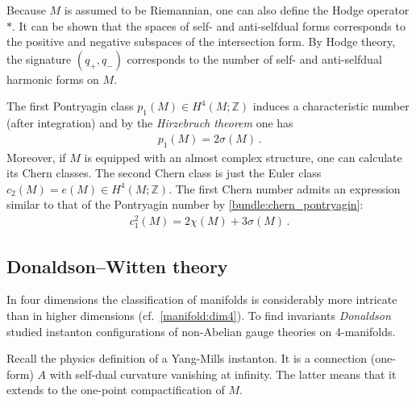     Because $M$ is assumed to be Riemannian, one can also define the Hodge operator $\ast$. It can be shown that the spaces of self- and anti-selfdual forms corresponds to the positive and negative subspaces of the intersection form. By Hodge theory, the signature $(q_+,q_-)$ corresponds to the number of self- and anti-selfdual harmonic forms on $M$.

    The first Pontryagin class $p_1(M)\in H^4(M;\mathbb{Z})$ induces a characteristic number (after integration) and by the \textit{Hirzebruch theorem} one has
    \begin{gather}
        p_1(M) = 2\sigma(M)\,.
    \end{gather}
    Moreover, if $M$ is equipped with an almost complex structure, one can calculate its Chern classes. The second Chern class is just the Euler class $c_2(M)=e(M)\in H^4(M;\mathbb{Z})$. The first Chern number admits an expression similar to that of the Pontryagin number by \cref{bundle:chern_pontryagin}:
    \begin{gather}
        c^2_1(M) = 2\chi(M) + 3\sigma(M)\,.
    \end{gather}

\subsection{Donaldson--Witten theory}

    In four dimensions the classification of manifolds is considerably more intricate than in higher dimensions (cf.~\cref{manifold:dim4}). To find invariants \textit{Donaldson} studied instanton configurations of non-Abelian gauge theories on 4-manifolds.

    Recall the physics definition of a Yang-Mills instanton. It is a connection (one-form) $A$ with self-dual curvature vanishing at infinity. The latter means that it extends to the one-point compactification of $M$.

